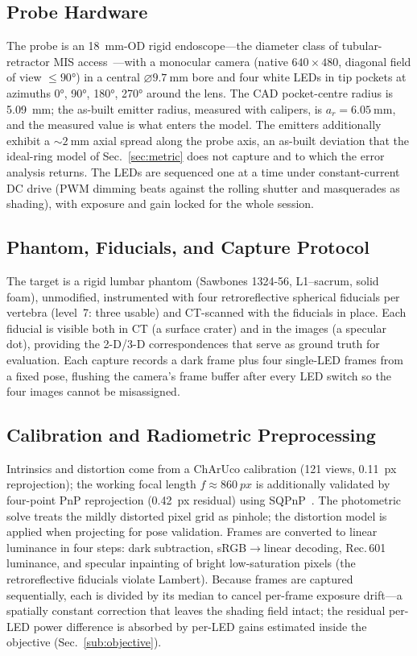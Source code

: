 \documentclass[conference]{IEEEtran}
\begin{document}
\subsection{Probe Hardware}\label{sub:hw}
The probe is an \SI{18}{\milli\meter}-OD rigid endoscope---the diameter
class of tubular-retractor MIS access~\cite{foley2003}---with a monocular
camera (native $640\times480$, diagonal field of view
$\le\ang{90}$) in a central $\varnothing\SI{9.7}{\milli\meter}$ bore and
four white LEDs in tip pockets at azimuths \ang{0}, \ang{90}, \ang{180},
\ang{270} around the lens.  The CAD pocket-centre radius is
\SI{5.09}{\milli\meter}; the as-built emitter radius, measured with
calipers, is $a_r=\SI{6.05}{\milli\meter}$, and the measured value is what
enters the model.  The emitters additionally exhibit a
${\sim}\SI{2}{\milli\meter}$ axial spread along the probe axis, an
as-built deviation that the ideal-ring model of Sec.~\ref{sec:metric}
does not capture and to which the error analysis returns.  The LEDs are
sequenced one at a time under constant-current DC drive (PWM dimming
beats against the rolling shutter and masquerades as shading), with
exposure and gain locked for the whole session.

\subsection{Phantom, Fiducials, and Capture Protocol}\label{sub:phantom}
The target is a rigid lumbar phantom (Sawbones 1324-56, L1--sacrum, solid
foam), unmodified, instrumented with four retroreflective spherical
fiducials per vertebra (level~7: three usable) and CT-scanned with the
fiducials in place.  Each fiducial is visible both in CT (a surface
crater) and in the images (a specular dot), providing the 2-D/3-D
correspondences that serve as ground truth for evaluation.  Each capture
records a dark frame plus four single-LED frames from a fixed pose,
flushing the camera's frame buffer after every LED switch so the four
images cannot be misassigned.

\subsection{Calibration and Radiometric Preprocessing}\label{sub:sys}
Intrinsics and distortion come from a ChArUco calibration (121 views,
\SI{0.11}{px} reprojection); the working focal length
$f\!\approx\!\SI{860}{px}$ is additionally validated by four-point PnP
reprojection (\SI{0.42}{px} residual) using SQPnP~\cite{terzakis2020}.
The photometric solve treats the mildly distorted pixel grid as pinhole;
the distortion model is applied when projecting for pose validation.
Frames are converted to linear luminance in four steps: dark subtraction,
sRGB$\to$linear decoding, Rec.\,601 luminance, and specular inpainting of
bright low-saturation pixels (the retroreflective fiducials violate
Lambert).  Because frames are captured sequentially, each is divided by
its median to cancel per-frame exposure drift---a spatially constant
correction that leaves the shading field intact; the residual per-LED
power difference is absorbed by per-LED gains estimated inside the
objective (Sec.~\ref{sub:objective}).
\end{document}

